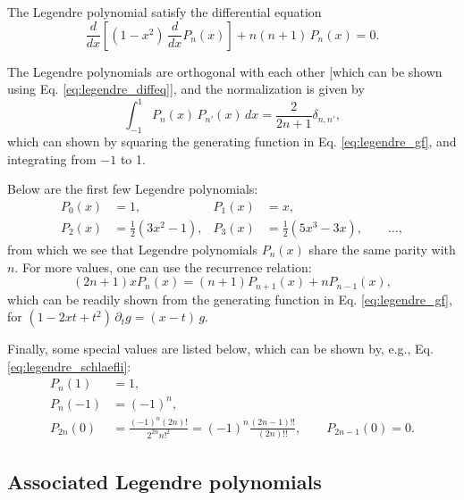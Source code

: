 \documentclass[11pt]{article}
\begin{document}
The Legendre polynomial satisfy the differential equation
\begin{equation}
  \frac{d}{dx}
  \left[
    (1 - x^2) \, \frac{d}{dx} P_n(x)
  \right]
+ n (n + 1) \, P_n(x) = 0.
\label{eq:legendre_diffeq}
\end{equation}

The Legendre polynomials are orthogonal with each other
[which can be shown using Eq. \eqref{eq:legendre_diffeq}],
and the normalization is given by
\begin{equation}
  \int_{-1}^1
  P_n(x) \, P_{n'}(x) \, dx
=
  \frac { 2 } { 2 n + 1} \delta_{n, n'},
  \label{eq:legendre_orthonormal}
\end{equation}
which can shown by squaring
the generating function in Eq. \eqref{eq:legendre_gf},
and integrating from $-1$ to 1.

Below are the first few Legendre polynomials:
%
\begin{align*}
  P_0(x) &= 1, &
  P_1(x) &= x, \\
  P_2(x) &= \frac{1}{2}(3 x^2 - 1), &
  P_3(x) &= \frac{1}{2}(5 x^3 - 3 x),
  \qquad \dots,
\end{align*}
from which we see that
Legendre polynomials $P_n(x)$ share the same parity with $n$.
For more values, one can use the recurrence relation:
\begin{equation}
  (2 n + 1) x P_n(x) = (n + 1) P_{n+1}(x) + n P_{n-1}(x),
  \label{eq:legendre_recur_dt}
\end{equation}
which can be readily shown from the generating function in Eq. \eqref{eq:legendre_gf},
for
$(1 - 2 x t + t^2) \, \partial_t g = (x - t) \, g$.

Finally, some special values are listed below,
which can be shown by, e.g., Eq. \eqref{eq:legendre_schlaefli}:
%
\begin{align}
  P_n(1)    &= 1,
  \label{eq:legendre_1} \\
  P_n(-1)   &= (-1)^n,
  \label{eq:legendre_neg1} \\
  P_{2n}(0) &= \frac{ (-1)^n (2 n)! }{ 2^{2n} n!^2 }
             = (-1)^n \frac{ (2 n - 1)!! } { (2n)!! },
  \qquad
  P_{2n-1}(0) = 0.
  \label{eq:legendre_0}
\end{align}



\subsection{Associated Legendre polynomials}
\end{document}
